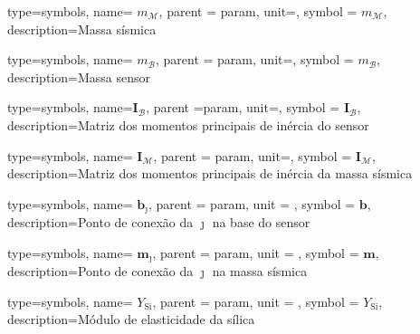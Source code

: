 {type=symbols,
	name= \ensuremath{m_{\mathcal{M}}},
	parent = {param},
	unit=\unexpanded{\si{\kilo\gram}},
	symbol = \ensuremath{m_{\mathcal{M}}},
	description={Massa sísmica}
}


{type=symbols,
	name= \ensuremath{m_{\mathcal{B}}},
	parent = {param},
	unit=\unexpanded{\si{\kilo\gram}},
	symbol = \ensuremath{m_{\mathcal{B}}},
	description={Massa sensor}
}


{type=symbols,
name=\ensuremath{\mathbf{I}_{\mathcal{B}}},
parent ={param},
unit=\unexpanded{\si{\kilo\gram\meter\squared}},
symbol = \ensuremath{\mathbf{I}_{\mathcal{B}}},
description={Matriz dos momentos principais de inércia do sensor}
}

{type=symbols,
name= \ensuremath{\mathbf{I}_{\mathcal{M}}},
parent = {param},
unit=\unexpanded{\si{\kilo\gram\meter\squared}},
symbol = \ensuremath{\mathbf{I}_{\mathcal{M}}},
description={Matriz dos momentos principais de inércia da massa sísmica}
}

{type=symbols,
name= \ensuremath{\mathbf{b}_{\jmath}},
parent = {param},
unit = \unexpanded{\si{\meter}},
symbol = \ensuremath{\mathbf{b}},
description={Ponto de conexão da  $\jmath$ na base do sensor}
}


{type=symbols,
name= \ensuremath{\mathbf{m}_{\jmath}},
parent = {param},
unit = \unexpanded{\si{\meter}},
symbol = \ensuremath{\mathbf{m}},
description={Ponto de conexão da  $\jmath$ na massa sísmica}
}

{type=symbols,
name= \ensuremath{Y_{\mathrm{Si}}},
parent = {param},
unit = \unexpanded{\si{\newton\per\meter\squared}},
symbol = \ensuremath{Y_{\mathrm{Si}}},
description={Módulo de elasticidade da sílica}
}